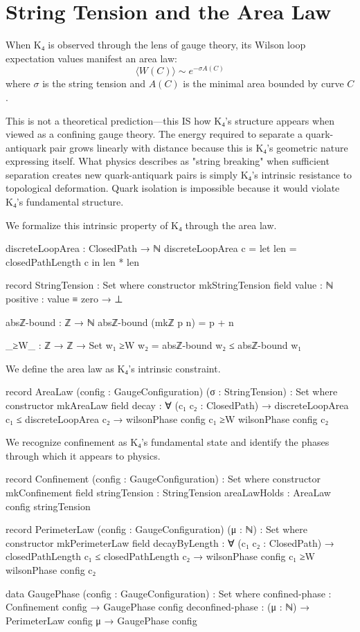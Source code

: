 \documentclass[11pt,a4paper]{book}
\begin{document}
\section{String Tension and the Area Law}

When K₄ is observed through the lens of gauge theory, its Wilson loop expectation values manifest an area law:
\[
\langle W(C) \rangle \sim e^{-\sigma A(C)}
\]
where $\sigma$ is the string tension and $A(C)$ is the minimal area bounded by curve $C$.

This is not a theoretical prediction—this IS how K₄'s structure appears when viewed as a confining gauge theory. The energy required to separate a quark-antiquark pair grows linearly with distance because this is K₄'s geometric nature expressing itself. What physics describes as "string breaking" when sufficient separation creates new quark-antiquark pairs is simply K₄'s intrinsic resistance to topological deformation. Quark isolation is impossible because it would violate K₄'s fundamental structure.

We formalize this intrinsic property of K₄ through the area law.

\begin{code}
discreteLoopArea : ClosedPath → ℕ
discreteLoopArea c = 
  let len = closedPathLength c
  in len * len

record StringTension : Set where
  constructor mkStringTension
  field
    value    : ℕ
    positive : value ≡ zero → ⊥

absℤ-bound : ℤ → ℕ
absℤ-bound (mkℤ p n) = p + n

_≥W_ : ℤ → ℤ → Set
w₁ ≥W w₂ = absℤ-bound w₂ ≤ absℤ-bound w₁
\end{code}

We define the area law as K₄'s intrinsic constraint.

\begin{code}
record AreaLaw (config : GaugeConfiguration) (σ : StringTension) : Set where
  constructor mkAreaLaw
  field
    decay : ∀ (c₁ c₂ : ClosedPath) →
            discreteLoopArea c₁ ≤ discreteLoopArea c₂ →
            wilsonPhase config c₁ ≥W wilsonPhase config c₂
\end{code}

We recognize confinement as K₄'s fundamental state and identify the phases through which it appears to physics.

\begin{code}
record Confinement (config : GaugeConfiguration) : Set where
  constructor mkConfinement
  field
    stringTension : StringTension
    areaLawHolds  : AreaLaw config stringTension

record PerimeterLaw (config : GaugeConfiguration) (μ : ℕ) : Set where
  constructor mkPerimeterLaw
  field
    decayByLength : ∀ (c₁ c₂ : ClosedPath) →
                    closedPathLength c₁ ≤ closedPathLength c₂ →
                    wilsonPhase config c₁ ≥W wilsonPhase config c₂

data GaugePhase (config : GaugeConfiguration) : Set where
  confined-phase   : Confinement config → GaugePhase config
  deconfined-phase : (μ : ℕ) → PerimeterLaw config μ → GaugePhase config
\end{code}
\end{document}
